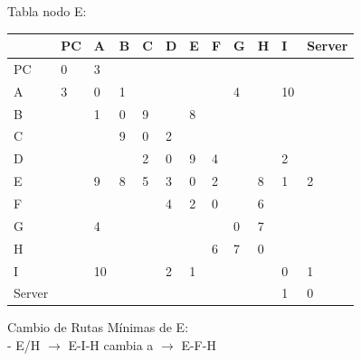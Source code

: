 \documentclass[a4paper]{article}
\begin{document}
\begin{table}[ht]
Tabla nodo E:\\
\begin{tabular}{|l|l|l|l|l|l|l|l|l|l|l|l|}
\hline
       & PC & A  & B & C & D & E & F & G & H & I  & Server \\ \hline
PC     & 0  & 3  &   &   &   &   &   &   &   &    &        \\ \hline
A      & 3  & 0  & 1 &   &   &   &   & 4 &   & 10 &        \\ \hline
B      &    & 1  & 0 & 9 &   & 8 &   &   &   &    &        \\ \hline
C      &    &    & 9 & 0 & 2 &   &   &   &   &    &        \\ \hline
D      &    &    &   & 2 & 0 & 9 & 4 &   &   & 2  &        \\ \hline
E      &    & 9  & 8 & 5 & 3 & 0 & 2 &   & 8 & 1  & 2      \\ \hline
F      &    &    &   &   & 4 & 2 & 0 &   & 6 &    &        \\ \hline
G      &    & 4  &   &   &   &   &   & 0 & 7 &    &        \\ \hline
H      &    &    &   &   &   &   & 6 & 7 & 0 &    &        \\ \hline
I      &    & 10 &   &   & 2 & 1 &   &   &   & 0  & 1      \\ \hline
Server &    &    &   &   &   &   &   &   &   & 1  & 0      \\ \hline
\end{tabular}

Cambio de Rutas Mínimas de E:\\
-	E/H  $\rightarrow$ E-I-H  cambia a  $\rightarrow$  E-F-H

\end{table}
\clearpage
\end{document}
